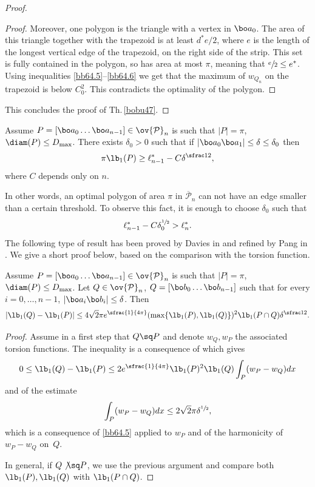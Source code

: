 \begin{proof}
\begin{proof}
Moreover, one polygon is the triangle with a vertex in $\bo a_0$. The area of this triangle together with the {trapezoid} is at least $d^* e/2$, where $e$ is the length of the longest vertical edge of the {trapezoid}, on the right side of the strip. This set is fully contained in the polygon, so has area at most $\pi$, meaning that $\sfrac e2 \le e^*$. Using inequalities \eqref{bb64.5}--\eqref{bb64.6} we get that the maximum of $w_{Q_n}$ on the {trapezoid} is below $C_0^2$. This contradicts the optimality of the polygon.
\end{proof}
This concludes the proof of Th.\,\ref{bobu47}.
\end{proof}

\begin{thm}\label{bobu220}
Assume $P=[\bo a_0\dots \bo a_{n-1}] \in \ov {\mathcal P}_n$ is such that $|P|=\pi$, $\diam (P)\le D_{\max}$. There exists $\delta _0 >0$ such that if $|\bo a_0\bo a_1|\le \delta\le \delta_0$ then
\begin{equation}\label{bobu221}
\pi \lb_1(P)\ge \ell_{n-1}^*-C\delta^{\sfrac12},
\end{equation}
where $C $ depends only on $n$.
\end{thm}
In other words, an optimal polygon of area $\pi$ in $\overline {\mathcal P}_n$ can not have an edge smaller than a certain threshold. To observe this fact, it is enough to choose $\delta_0 $ such that
\begin{equation}
\ell_{n-1}^*-C\delta_0^{\sfrac 12}> \ell_n^*.
\label{eq:delta-edge-min}
\end{equation}
The following type of result has been proved by Davies in \cite{Da93} and refined by Pang in \cite{Pa97}. We give a short proof below, based on the comparison with the torsion function.
\begin{lemma}\label{bobu223}
Assume $P=[\bo a_0\dots\bo a_{n-1}] \in \ov {\mathcal P}_n$ is such that $|P|=\pi$, $\diam (P)\le D_{\max}$. Let $Q \in \ov {\mathcal P}_n$, $Q=[\bo b_0\dots\bo b_{n-1}] $ such that for every $i=0, \dots, n-1$, $|\bo a_i\bo b_i|\le \delta$.
Then
\[
|\lb_1(Q)-\lb_1(P)| \le 4 \sqrt{2}\pi e^{\sfrac{1}{4\pi}}(\max \{\lb_1(P), \lb_1(Q)\})^2\lb_1(P\cap Q) \delta^{\sfrac 12}.
\]
\end{lemma}
\begin{proof}
Assume in a first step that $Q \sq P$ and {denote $w_Q, w_P$ the associated torsion functions}.
The inequality is a consequence of \cite[Ineq.\,(2.6)]{BuMa15} which gives
\[
0\le \lb_1(Q)-\lb_1(P) \le 2e^{\sfrac{1}{4\pi}}\lb_1(P)^2\lb_1(Q)\int_P (w_P-w_Q) dx
\]
and of the estimate
\[
\int_P (w_P-w_Q) dx \le 2\sqrt{2} \pi \delta^{\sfrac 12},
\]
which is a consequence of \eqref{bb64.5} applied to $w_P$ and of the harmonicity of $w_P-w_Q$ on~$Q$.

In general, if $Q \not \sq P$, we use the previous argument and compare both $\lb_1(P), \lb_1(Q)$ with $\lb_1(P\cap Q)$.
\end{proof}

